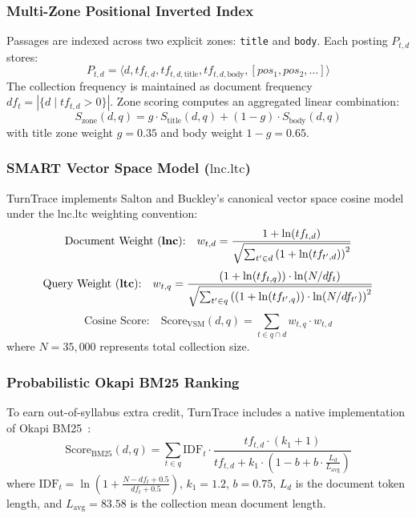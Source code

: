 \documentclass[10pt,a4paper,twocolumn]{article}
\begin{document}
\subsubsection{Multi-Zone Positional Inverted Index}
Passages are indexed across two explicit zones: \texttt{title} and \texttt{body}. Each posting $P_{t,d}$ stores:
\begin{equation}
    P_{t,d} = \langle d, tf_{t,d}, tf_{t,d,\text{title}}, tf_{t,d,\text{body}}, [pos_1, pos_2, \dots] \rangle
\end{equation}
The collection frequency is maintained as document frequency $df_t = |\{d \mid tf_{t,d} > 0\}|$. Zone scoring computes an aggregated linear combination:
\begin{equation}
    S_{\text{zone}}(d, q) = g \cdot S_{\text{title}}(d, q) + (1 - g) \cdot S_{\text{body}}(d, q)
\end{equation}
with title zone weight $g = 0.35$ and body weight $1 - g = 0.65$.

\subsubsection{SMART Vector Space Model (\texorpdfstring{$\text{lnc.ltc}$}{lnc.ltc})}
TurnTrace implements Salton and Buckley's canonical vector space cosine model~\cite{salton1988term} under the $\text{lnc.ltc}$ weighting convention:
\begin{equation}
    \text{Document Weight (\textbf{lnc}):} \quad w_{t,d} = \frac{1 + \ln(tf_{t,d})}{\sqrt{\sum_{t' \in d} \left(1 + \ln(tf_{t',d})\right)^2}}
\end{equation}
\begin{equation}
    \text{Query Weight (\textbf{ltc}):} \quad w_{t,q} = \frac{\left(1 + \ln(tf_{t,q})\right) \cdot \ln(N / df_t)}{\sqrt{\sum_{t' \in q} \left(\left(1 + \ln(tf_{t',q})\right) \cdot \ln(N / df_{t'})\right)^2}}
\end{equation}
\begin{equation}
    \text{Cosine Score:} \quad \text{Score}_{\text{VSM}}(d, q) = \sum_{t \in q \cap d} w_{t,q} \cdot w_{t,d}
\end{equation}
where $N = 35,000$ represents total collection size.

\subsubsection{Probabilistic Okapi BM25 Ranking}
To earn out-of-syllabus extra credit, TurnTrace includes a native implementation of Okapi BM25~\cite{robertson2009probabilistic}:
\begin{equation}
    \text{Score}_{\text{BM25}}(d, q) = \sum_{t \in q} \text{IDF}_t \cdot \frac{tf_{t,d} \cdot (k_1 + 1)}{tf_{t,d} + k_1 \cdot \left(1 - b + b \cdot \frac{L_d}{L_{\text{avg}}}\right)}
\end{equation}
where $\text{IDF}_t = \ln\left(1 + \frac{N - df_t + 0.5}{df_t + 0.5}\right)$, $k_1 = 1.2$, $b = 0.75$, $L_d$ is the document token length, and $L_{\text{avg}} = 83.58$ is the collection mean document length.
\end{document}
